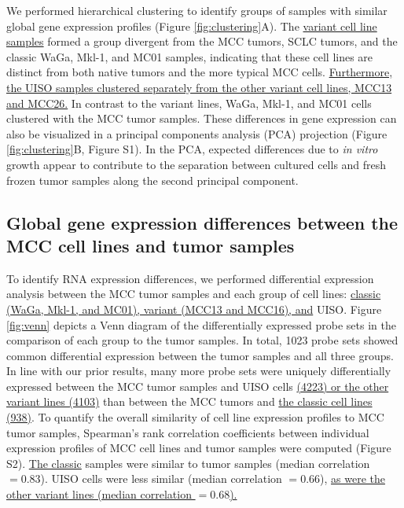 \documentclass[10pt]{article}
\begin{document}
We performed hierarchical clustering to identify groups of samples with similar global gene expression profiles (Figure \ref{fig:clustering}A).
The \uline{variant cell line samples} formed a group divergent from the MCC tumors, SCLC tumors, and the classic WaGa, Mkl-1, and MC01 samples, indicating that these cell lines are distinct from both native tumors and the more typical MCC cells.
\uline{Furthermore, the UISO samples clustered separately from the other variant cell lines, MCC13 and MCC26.}
In contrast to the variant lines, WaGa, Mkl-1, and MC01 cells clustered with the MCC tumor samples.
These differences in gene expression can also be visualized in a principal components analysis (PCA) projection (Figure \ref{fig:clustering}B, Figure S1).
In the PCA, expected differences due to \emph{in vitro} growth appear to contribute to the separation between cultured cells and fresh frozen tumor samples along the second principal component.

\subsection*{Global gene expression differences between the MCC cell lines and tumor samples}
To identify RNA expression differences, we performed differential expression analysis between the MCC tumor samples and each group of cell lines: \uline{classic (WaGa, Mkl-1, and MC01), variant (MCC13 and MCC16), and} UISO.
Figure \ref{fig:venn} depicts a Venn diagram of the differentially expressed probe sets in the comparison of each group to the tumor samples.
In total, 1023 probe sets showed common differential expression between the tumor samples and all three groups.
In line with our prior results, many more probe sets were uniquely differentially expressed between the MCC tumor samples and UISO cells \uline{(4223) or the other variant lines (4103)} than between the MCC tumors and \uline{the classic cell lines (938)}.
To quantify the overall similarity of cell line expression profiles to MCC tumor samples, Spearman's rank correlation coefficients between individual expression profiles of MCC cell lines and tumor samples were computed (Figure S2).
\uline{The classic} samples were similar to tumor samples (median correlation $=0.83$).
UISO cells were less similar (median correlation $=0.66$), \uline{as were the other variant lines (median correlation $=0.68$).}
\end{document}
